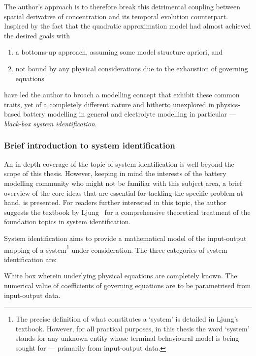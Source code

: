 The author's  approach is to  therefore break this detrimental  coupling between
spatial  derivative of  concentration  and its  temporal evolution  counterpart.
Inspired by the fact that the  quadratic approximation model had almost achieved
the desired goals with
\begin{enumerate}[label=\emph{\alph*})]
    \item a bottoms-up approach, \ie{} assuming some model structure apriori, and
    \item not bound by any physical considerations due to the exhaustion of governing equations
\end{enumerate}
have led  the author  to broach  a modelling concept  that exhibit  these common
traits,  yet  of  a  completely  different nature  and  hitherto  unexplored  in
physics-based  battery  modelling  in   general  and  electrolyte  modelling  in
particular --- \emph{black-box system identification}.

\subsubsection*{Brief introduction to system identification}\label{subsubsec:introsysid}

An in-depth  coverage of the topic  of system identification is  well beyond the
scope of  this thesis.  However, keeping  in mind the  interests of  the battery
modelling community  who might not be  familiar with this subject  area, a brief
overview of the core ideas that  are essential for tackling the specific problem
at hand, is presented. For readers  further interested in this topic, the author
suggests the textbook by  Ljung~\cite{Ljung1999} for a comprehensive theoretical
treatment of the foundation topics in system identification.

System identification aims  to provide a mathematical model  of the input-output
mapping  of  a system\footnote{The  precise  definition  of what  constitutes  a
`system' is detailed  in Ljung's textbook. However, for  all practical purposes,
in this  thesis the word `system'  stands for any unknown  entity whose terminal
behavioural model  is being  sought for ---  primarily from  input-output data.}
under consideration. The three categories of system identification are:


\begin{enumdescriptnum}[leftmargin=!,itemsep=1ex,labelwidth=\widthof{$\symbf{\text{brugg}_j}\ \scriptstyle (\times 3)$abc}
    ,partopsep=0pt
    ,topsep=0pt
    ]

\item[White box] wherein underlying physical equations are completely known. The
numerical value  of coefficients of  governing equations are to  be parametrised
from input-output data.

\end{enumdescriptnum}


